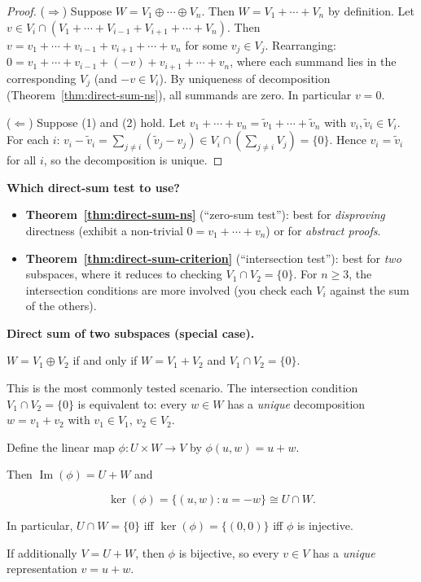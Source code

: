 \begin{proof}
($\Rightarrow$) Suppose $W=V_1\oplus\cdots\oplus V_n$.  Then $W=V_1+\cdots+V_n$ by definition.
Let $v\in V_i\cap(V_1+\cdots+V_{i-1}+V_{i+1}+\cdots+V_n)$.
Then $v=v_1+\cdots+v_{i-1}+v_{i+1}+\cdots+v_n$ for some $v_j\in V_j$.
Rearranging: $0=v_1+\cdots+v_{i-1}+(-v)+v_{i+1}+\cdots+v_n$, where each summand lies in the corresponding $V_j$ (and $-v\in V_i$).  By uniqueness of decomposition (Theorem~\ref{thm:direct-sum-ns}), all summands are zero.  In particular $v=0$.

($\Leftarrow$) Suppose (1) and (2) hold.
Let $v_1+\cdots+v_n=\tilde{v}_1+\cdots+\tilde{v}_n$ with $v_i,\tilde{v}_i\in V_i$.
For each $i$: $v_i-\tilde{v}_i = \sum_{j\neq i}(\tilde{v}_j-v_j)\in V_i\cap(\sum_{j\neq i}V_j)=\{0\}$.
Hence $v_i=\tilde{v}_i$ for all $i$, so the decomposition is unique.
\end{proof}

\begin{examtip}
\textbf{Which direct-sum test to use?}
\begin{itemize}[leftmargin=*]
\item \textbf{Theorem~\ref{thm:direct-sum-ns}} (``zero-sum test''): best for \emph{disproving} directness (exhibit a non-trivial $0=v_1+\cdots+v_n$) or for \emph{abstract proofs}.
\item \textbf{Theorem~\ref{thm:direct-sum-criterion}} (``intersection test''): best for \emph{two} subspaces, where it reduces to checking $V_1\cap V_2=\{0\}$.  For $n\ge 3$, the intersection conditions are more involved (you check each $V_i$ against the sum of the others).
\end{itemize}
\end{examtip}

\begin{keyformula}
\textbf{Direct sum of two subspaces (special case).}

$W=V_1\oplus V_2$ if and only if $W=V_1+V_2$ and $V_1\cap V_2=\{0\}$.

\medskip
This is the most commonly tested scenario.  The intersection condition $V_1\cap V_2=\{0\}$ is equivalent to: every $w\in W$ has a \emph{unique} decomposition $w=v_1+v_2$ with $v_1\in V_1$, $v_2\in V_2$.
\end{keyformula}

\begin{extension}[title={Extension (Lecture Week 2: Direct sums via the sum map)}]

Define the linear map $\phi:U\times W\to V$ by $\phi(u,w)=u+w$.

Then $\operatorname{Im}(\phi)=U+W$ and

\[
\ker(\phi)=\{(u,w):u=-w\} \cong U\cap W.
\]

In particular, $U\cap W=\{0\}$ iff $\ker(\phi)=\{(0,0)\}$ iff $\phi$ is injective.

If additionally $V=U+W$, then $\phi$ is bijective, so every $v\in V$ has a \emph{unique} representation $v=u+w$.

\end{extension}

